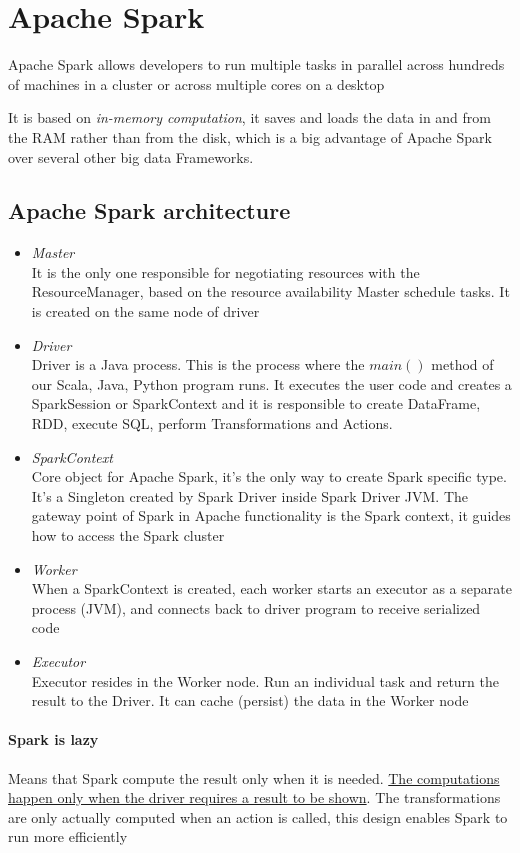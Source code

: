 \section{Apache Spark}
Apache Spark allows developers to run multiple tasks in parallel across hundreds of machines in a cluster or across multiple cores on a desktop

 It is based on \textit{in-memory computation}, it saves and loads the data in and from the RAM rather than from the disk, which is a big advantage of Apache Spark over several other big data Frameworks. 

\subsection{Apache Spark architecture}
\begin{itemize}
    \item \textit{Master}\\
    It is the only one responsible for negotiating resources with the ResourceManager, based on the resource availability Master schedule tasks. It is created on the same node of driver
    \item \textit{Driver}\\
    Driver is a Java process. This is the process where the $main()$ method of our Scala, Java, Python program runs. It executes the user code and creates a SparkSession or SparkContext and it is responsible to create DataFrame, RDD, execute SQL, perform Transformations and Actions.
    \item \textit{SparkContext}\\
    Core object for Apache Spark, it’s the only way to create Spark specific type. It's a Singleton created by Spark Driver inside Spark Driver JVM. The gateway point of Spark in Apache functionality is the Spark context, it guides how to access the Spark cluster
    \item \textit{Worker}\\
    When a SparkContext is created, each worker starts an executor as a separate process (JVM), and connects back to driver program to receive serialized code
    \item \textit{Executor}\\
    Executor resides in the Worker node. Run an individual task and return the result to the Driver. It can cache (persist) the data in the Worker node
\end{itemize}

\paragraph{Spark is lazy}
Means that Spark compute the result only when it is needed. \uline{The computations happen only when the driver requires a result to be shown}. The transformations are only actually computed when an action is called, this design enables Spark to run more efficiently

